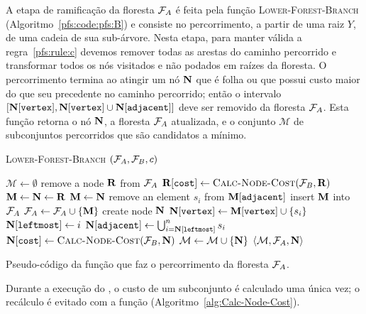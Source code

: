 A etapa de ramificação da floresta $\mathcal{F}_A$ é feita pela função 
\textsc{Lower-Forest-Branch} (Algoritmo~\ref{pfs:code:pfs:B}) e consiste no percorrimento, a partir de uma 
raiz $Y$, de uma cadeia de sua sub-árvore. Nesta etapa, para manter 
válida a regra~\ref{pfs:rule:c} devemos remover todas as arestas do 
caminho percorrido e transformar todos os nós visitados e não podados em 
raízes da floresta. O percorrimento termina ao atingir um nó 
$\mathbf N$ que é folha ou que possui custo maior do que seu 
precedente no caminho percorrido; então o intervalo 
$[\mathbf N[\texttt{vertex}], \mathbf N[\texttt{vertex}] \cup \mathbf N[\texttt{adjacent}]]$
deve ser removido da floresta $\mathcal{F}_A$. Esta função retorna o nó 
$\mathbf N$, a floresta $\mathcal{F}_A$ atualizada, e o conjunto 
$\mathcal{M}$ de subconjuntos percorridos que são candidatos a mínimo.

\begin{algorithm}[ht]
\textsc{Lower-Forest-Branch} $(\mathcal{F}_A, \mathcal{F}_B, c)$
\begin{algorithmic}[1]
    \State $\mathcal{M} \gets \emptyset$
    \State remove a node $\mathbf R$ from $\mathcal{F}_A$
    \State $\mathbf R[\texttt{cost}] \gets {\normalfont\textsc{Calc-Node-Cost}}(\mathcal{F}_B, \mathbf R)$
    \State $\mathbf M \gets \mathbf N \gets \mathbf R$
        \State $\mathbf M \gets \mathbf N$
        \State remove an element $s_i$ from $\mathbf M[\texttt{adjacent}]$
        \State insert $\mathbf M$ into $\mathcal{F}_A$
        \State $\mathcal{F}_A \gets \mathcal{F}_A \cup \{\mathbf M\}$
        \State create node $\mathbf N$
        \State $\mathbf N[\texttt{vertex}] \gets \mathbf M[\texttt{vertex}] \cup \{s_i\}$
        \State $\mathbf N[\texttt{leftmost}] \gets i$
        \State $\mathbf N[\texttt{adjacent}] \gets \bigcup_{i=\mathbf N[\texttt{leftmost}]}^{n} s_i$
        \State $\mathbf N[\texttt{cost}] \gets {\normalfont\textsc{Calc-Node-Cost}} (\mathcal{F}_B, \mathbf N)$
        \State $\mathcal{M} \gets \mathcal{M} \cup \{\mathbf N\}$
    \EndWhile
    \Return $\langle \mathcal{M}, \mathcal{F}_A, \mathbf N\rangle$
\end{algorithmic}
\caption{Pseudo-código da função que faz o percorrimento da floresta $\mathcal{F}_A$.}
\label{pfs:code:pfs:B}
\end{algorithm}

Durante a execução do , o custo de um subconjunto é calculado uma única vez; o recálculo é evitado com a função  (Algoritmo~\ref{alg:Calc-Node-Cost}).

